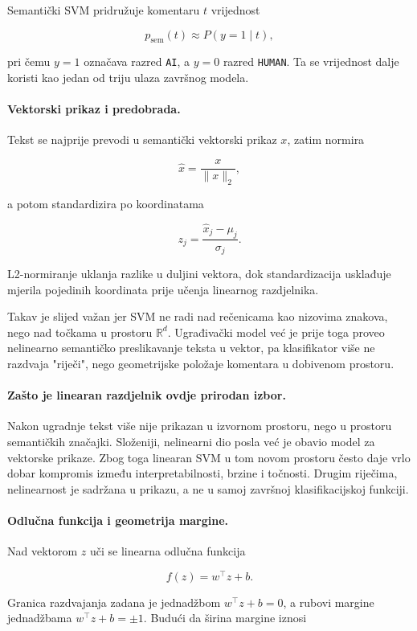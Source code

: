 \documentclass{article}
\begin{document}
Semantički SVM pridružuje komentaru $t$ vrijednost

\[
p_{\mathrm{sem}}(t) \approx P(y=1\mid t),
\]

pri čemu $y=1$ označava razred \texttt{AI}, a $y=0$ razred \texttt{HUMAN}. Ta se vrijednost dalje koristi kao jedan od triju ulaza završnog modela.

\paragraph{Vektorski prikaz i predobrada.}
Tekst se najprije prevodi u semantički vektorski prikaz $x$, zatim normira

\[
\hat{x}=\frac{x}{\|x\|_2},
\]

a potom standardizira po koordinatama

\[
z_j=\frac{\hat{x}_j-\mu_j}{\sigma_j}.
\]

L2-normiranje uklanja razlike u duljini vektora, dok standardizacija usklađuje mjerila pojedinih koordinata prije učenja linearnog razdjelnika.

Takav je slijed važan jer SVM ne radi nad rečenicama kao nizovima znakova, nego nad točkama u prostoru $\mathbb{R}^d$. Ugrađivački model već je prije toga proveo nelinearno semantičko preslikavanje teksta u vektor, pa klasifikator više ne razdvaja "riječi", nego geometrijske položaje komentara u dobivenom prostoru.

\paragraph{Zašto je linearan razdjelnik ovdje prirodan izbor.}
Nakon ugradnje tekst više nije prikazan u izvornom prostoru, nego u prostoru semantičkih značajki. Složeniji, nelinearni dio posla već je obavio model za vektorske prikaze. Zbog toga linearan SVM u tom novom prostoru često daje vrlo dobar kompromis između interpretabilnosti, brzine i točnosti. Drugim riječima, nelinearnost je sadržana u prikazu, a ne u samoj završnoj klasifikacijskoj funkciji.

\paragraph{Odlučna funkcija i geometrija margine.}
Nad vektorom $z$ uči se linearna odlučna funkcija

\[
f(z)=w^\top z+b.
\]

Granica razdvajanja zadana je jednadžbom $w^\top z+b=0$, a rubovi margine jednadžbama $w^\top z+b=\pm 1$. Budući da širina margine iznosi
\end{document}
